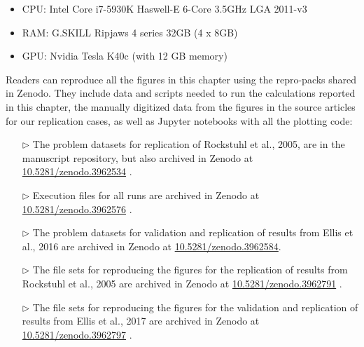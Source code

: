 \begin{itemize}
  \item CPU: Intel Core i7-5930K Haswell-E 6-Core 3.5GHz LGA 2011-v3
  \item RAM: G.SKILL Ripjaws 4 series 32GB (4 x 8GB)
  \item GPU: Nvidia Tesla K40c (with 12 GB memory)
\end{itemize}

Readers can reproduce all the figures in this chapter using the repro-packs shared in Zenodo. They include 
data and scripts needed to run the calculations reported in this chapter, the manually digitized data from the figures
in the source articles for our replication cases, as well as Jupyter notebooks with all the plotting code:

\begin{itemize}

\item[$\triangleright$] The problem datasets for replication of Rockstuhl et al., 2005, are in the manuscript repository, but also archived in Zenodo  at \href{https://doi.org/10.5281/zenodo.3962534}{10.5281/zenodo.3962534}  \cite{ClementiBarba2020-Zen_a}.

\item[$\triangleright$] Execution files for all runs are archived in Zenodo at \href{https://doi.org/10.5281/zenodo.3962576}{10.5281/zenodo.3962576} \cite{ClementiBarba2020-Zen_b}.

\item[$\triangleright$] The problem datasets for validation and replication of results from Ellis et al., 2016 are archived in Zenodo at \href{https://doi.org/10.5281/zenodo.3962584}{10.5281/zenodo.3962584}\cite{ClementiBarba2020-Zen_c}.

\item[$\triangleright$] The file sets for reproducing the figures for the replication of results from Rockstuhl et al., 2005 are archived in Zenodo at \href{https://doi.org/10.5281/zenodo.3962791}{10.5281/zenodo.3962791} \cite{ClementiBarba2020-Zen_d}.

\item[$\triangleright$] The file sets for reproducing the figures for the validation and replication of results from Ellis et al., 2017 are archived in Zenodo at \href{https://doi.org/3962797/zenodo.3962797}{10.5281/zenodo.3962797} \cite{ClementiBarba2020-Zen_e}.

\end{itemize}
